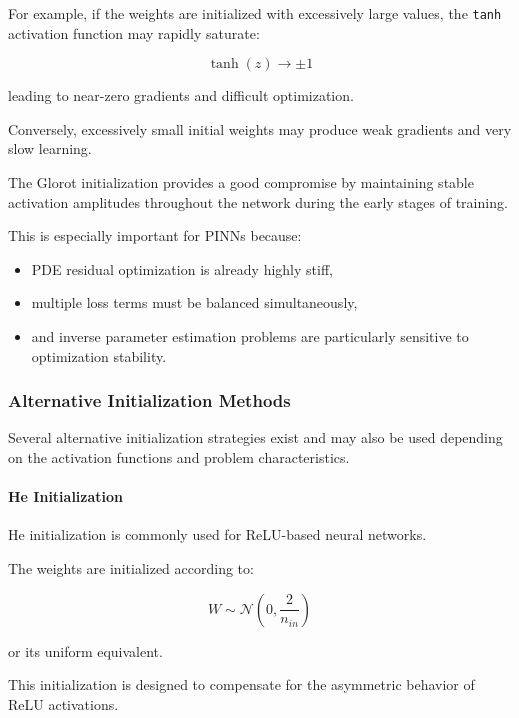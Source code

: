 For example, if the weights are initialized with excessively large values, the \texttt{tanh} activation function may rapidly saturate:

\begin{equation}
\tanh(z)
\rightarrow
\pm 1
\end{equation}

leading to near-zero gradients and difficult optimization.

Conversely, excessively small initial weights may produce weak gradients and very slow learning.

The Glorot initialization provides a good compromise by maintaining stable activation amplitudes throughout the network during the early stages of training.

This is especially important for PINNs because:
\begin{itemize}
    \item PDE residual optimization is already highly stiff,
    \item multiple loss terms must be balanced simultaneously,
    \item and inverse parameter estimation problems are particularly sensitive to optimization stability.
\end{itemize}

\subsubsection{Alternative Initialization Methods}

Several alternative initialization strategies exist and may also be used depending on the activation functions and problem characteristics.

\paragraph{He Initialization}

He initialization is commonly used for ReLU-based neural networks.

The weights are initialized according to:

\begin{equation}
W
\sim
\mathcal{N}
\left(
0,
\frac{2}{n_{in}}
\right)
\end{equation}

or its uniform equivalent.

This initialization is designed to compensate for the asymmetric behavior of ReLU activations.

